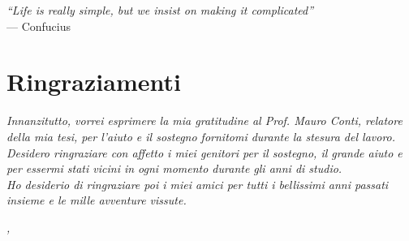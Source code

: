 
\cleardoublepage
{}
{}

\begin{flushright}{
	\slshape    
	``Life is really simple, but we insist on making it complicated''} \\ 
	\medskip
    --- Confucius
\end{flushright}


\bigskip

\begingroup
\let\clearpage\relax
\let\cleardoublepage\relax
\let\cleardoublepage\relax

\chapter*{Ringraziamenti}

\noindent \textit{Innanzitutto, vorrei esprimere la mia gratitudine al Prof. Mauro Conti, relatore della mia tesi, per l'aiuto e il sostegno fornitomi durante la stesura del lavoro.}\\

\noindent \textit{Desidero ringraziare con affetto i miei genitori per il sostegno, il grande aiuto e per essermi stati vicini in ogni momento durante gli anni di studio.}\\

\noindent \textit{Ho desiderio di ringraziare poi i miei amici per tutti i bellissimi anni passati insieme e le mille avventure vissute.}\\
\bigskip

\noindent\textit{\myLocation, \myTime}
\hfill \myName

\endgroup

